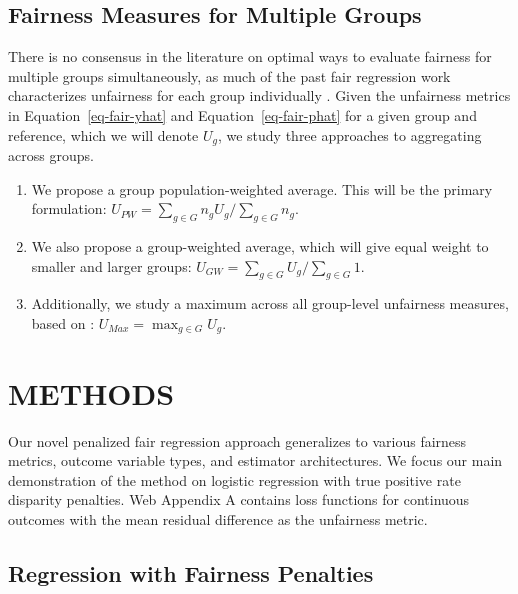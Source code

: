 \documentclass[
  12pt]{article}
\begin{document}
\subsection{Fairness Measures for Multiple
Groups}\label{sec-measures-groups}

There is no consensus in the literature on optimal ways to evaluate
fairness for multiple groups simultaneously, as much of the past fair
regression work characterizes unfairness for each group individually
\citep{agarwal_reductions_2018, komiyama_nonconvex_2018}. Given the
unfairness metrics in Equation~\ref{eq-fair-yhat} and
Equation~\ref{eq-fair-phat} for a given group and reference, which we
will denote \(U_g\), we study three approaches to aggregating across
groups.

\begin{enumerate}
\def\labelenumi{\arabic{enumi}.}
\item
  We propose a group population-weighted average. This will be the
  primary formulation:
  \(U_{PW} = \sum_{g \in G} n_g U_g / \sum_{g \in G} n_g\).
\item
  We also propose a group-weighted average, which will give equal weight
  to smaller and larger groups:
  \(U_{GW} = \sum_{g \in G} U_g / \sum_{g \in G} 1\).
\item
  Additionally, we study a maximum across all group-level unfairness
  measures, based on \citet{ghosh_characterizing_2022}:
  \(U_{Max} = \max_{g \in G} U_g\).
\end{enumerate}

\section{METHODS}\label{sec-methods}

Our novel penalized fair regression approach generalizes to various
fairness metrics, outcome variable types, and estimator architectures.
We focus our main demonstration of the method on logistic regression
with true positive rate disparity penalties. Web Appendix A contains
loss functions for continuous outcomes with the mean residual difference
as the unfairness metric.

\subsection{Regression with Fairness Penalties}\label{sec-penloss}
\end{document}
